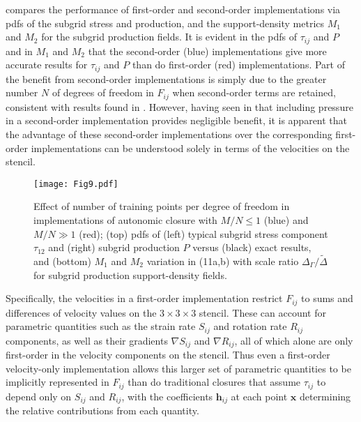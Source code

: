  compares the performance of first-order and second-order implementations via pdfs of the subgrid stress and production, and the support-density metrics  $M_1$ and $M_2$ for the subgrid production fields. It is evident in the pdfs of  $\tau_{ij}$ and $P$ and in $M_1$   and $M_2$  that the second-order (blue) implementations give more accurate results for  $\tau_{ij}$ and $P$ than do first-order (red) implementations. Part of the benefit from second-order implementations is simply due to the greater number $N$ of degrees of freedom in  $F_{ij}$ when second-order terms are retained, consistent with results found in . However, having seen in   that including pressure in a second-order implementation provides negligible benefit, it is apparent that the advantage of these second-order implementations over the corresponding first-order implementations can be understood solely in terms of the velocities on the stencil. 

%
\begin{figure}
	\begin{center}
	\texttt{[image: Fig9.pdf]}
	\caption{Effect of number of training points per degree of freedom in implementations of autonomic closure with $M/N \leq 1$ (blue) and $M/N \gg 1$  (red); (top) pdfs of (left) typical subgrid stress component $\tau_{12}$ and (right) subgrid production $P$ versus (black) exact results, and (bottom) $M_1$ and $M_2$ variation in (11a,b) with scale ratio $\Delta_{\Gamma}/\widetilde{\Delta}$ for subgrid production support-density fields.}
	\label{F:9}
	\end{center}
\end{figure}
%
%

Specifically, the velocities in a first-order implementation restrict  $F_{ij}$ to sums and differences of velocity values on the $3 \times 3 \times 3$  stencil. These can account for parametric quantities such as the strain rate $S_{ij}$  and rotation rate  $R_{ij}$ components, as well as their gradients $\nabla S_{ij}$  and $\nabla R_{ij}$, all of which alone are only first-order in the velocity components on the stencil. Thus even a first-order velocity-only implementation allows this larger set of parametric quantities to be implicitly represented in $F_{ij}$  than do traditional closures that assume $\tau_{ij}$  to depend only on $S_{ij}$  and $R_{ij}$, with the coefficients $\mathbf{h}_{ij}$  at each point $\mathbf{x}$ determining the relative contributions from each quantity. 

